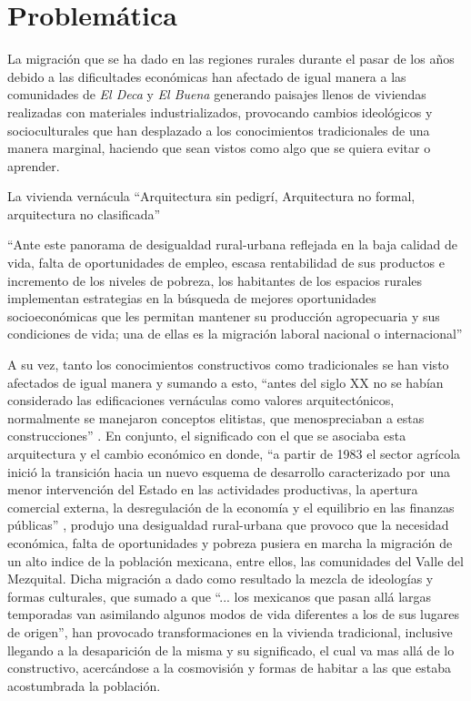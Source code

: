 \section{Problemática}

La migración que se ha dado en las regiones rurales durante el pasar de los años debido a las dificultades económicas han afectado de igual manera a las comunidades de \emph{El Deca} y \emph{El Buena} generando paisajes llenos de viviendas realizadas con materiales industrializados, provocando cambios ideológicos y socioculturales que han desplazado a los conocimientos tradicionales de una manera marginal, haciendo que sean vistos como algo que se quiera evitar o aprender.

La vivienda vernácula ``Arquitectura sin pedigrí, Arquitectura no formal, arquitectura no clasificada'' \citep[p .9]{rudofsky1976arquitectura}

``Ante este panorama de desigualdad rural-urbana reflejada en la baja calidad de vida, falta de oportunidades de empleo, escasa rentabilidad de sus productos e incremento de los niveles de pobreza, los habitantes de los espacios rurales implementan estrategias en la búsqueda de mejores oportunidades socioeconómicas que les permitan mantener su producción agropecuaria y sus condiciones de vida; una de ellas es la migración laboral nacional o internacional'' \citep[p. 126]{monroy2009}

%
A su vez, tanto los conocimientos constructivos como tradicionales se han visto afectados de igual manera y sumando a esto, ``antes del siglo XX no se habían considerado las edificaciones vernáculas como valores arquitectónicos, normalmente se manejaron conceptos elitistas, que menospreciaban a estas construcciones'' \citep[p. 2]{torrez1999revista}.
%
En conjunto, el significado con el que se asociaba esta arquitectura y el cambio económico en donde, ``a partir de 1983 el sector agrícola inició la transición hacia un nuevo esquema de desarrollo caracterizado por una menor intervención del Estado en las actividades productivas, la apertura comercial externa, la desregulación de la economía y el equilibrio en las finanzas públicas'' \citep[p. 41]{calderon2008politica}, produjo una desigualdad rural-urbana que provoco que la necesidad económica, falta de oportunidades y pobreza pusiera en marcha la migración de un alto indice de la población mexicana, entre ellos, las comunidades del Valle del Mezquital.
%
Dicha migración a dado como resultado la mezcla de ideologías y formas culturales, que sumado a que ``... los mexicanos que pasan allá largas temporadas van asimilando algunos modos de vida diferentes a los de sus lugares de origen''\citep[p. 28]{boils2010dadho}, han provocado transformaciones en la vivienda tradicional, inclusive llegando a la desaparición de la misma y su significado, el cual va mas allá de lo constructivo, acercándose a la cosmovisión y formas de habitar a las que estaba acostumbrada la población.
